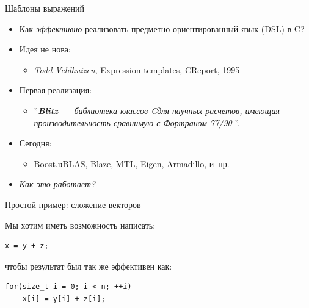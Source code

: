 \documentclass[@BEAMER_OPTIONS@]{beamer}
\newcommand{\CXX}{{\rm C}\plusplus}
\begin{document}
\begin{frame}{Шаблоны выражений}
    \begin{itemize}
        \item Как \emph{эффективно} реализовать предметно-ориентированный язык
            (DSL) в \CXX?
            \vspace{\baselineskip}
        \item Идея не нова:
            \begin{itemize}
                \item \emph{Todd Veldhuizen}, Expression templates, \CXX Report,
                    \alert{1995}
            \end{itemize}
        \item Первая реализация:
            \begin{itemize}
                \item ''{\rmfamily\textit{\textbf{\textcolor{chameleon2}{Blitz\plusplus}}~---
                    библиотека классов \CXX для научных расчетов, имеющая
                    производительность сравнимую с Фортраном 77/90}} ''.
            \end{itemize}
        \item Сегодня:
            \begin{itemize}
                \item Boost.uBLAS, Blaze, MTL, Eigen, Armadillo, и~пр.
            \end{itemize}
            \vspace{\baselineskip}
        \item \emph{Как это работает?}
    \end{itemize}
\end{frame}

\begin{frame}[fragile]{Простой пример: сложение векторов}
    \begin{exampleblock}{Мы хотим иметь возможность написать:}
        \begin{lstlisting}
x = y + z;
        \end{lstlisting}
    \end{exampleblock}

    \begin{exampleblock}{чтобы результат был так же эффективен как:}
        \begin{lstlisting}
for(size_t i = 0; i < n; ++i)
    x[i] = y[i] + z[i];
        \end{lstlisting}
    \end{exampleblock}
\end{frame}
\end{document}
